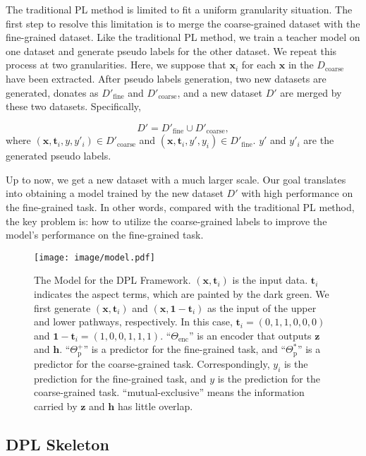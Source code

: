 \documentclass[11pt]{article}
\newcommand{\bx}{\mathbf{x}}
\newcommand{\bt}{\mathbf{t}}
\newcommand{\bz}{\mathbf{z}}
\newcommand{\bh}{\mathbf{h}}
\begin{document}
The traditional PL method is limited to fit a uniform granularity situation.
The first step to resolve this limitation is to merge the coarse-grained dataset with the fine-grained dataset.
Like the traditional PL method, we train a teacher model on one dataset and generate pseudo labels for the other dataset. We repeat this process at two granularities.
Here, we suppose that $\bx_i$ for each $\bx$ in the $D_{\text{coarse}}$ have been extracted.
After pseudo labels generation, two new datasets are generated, donates as $D'_{\text{fine}}$ and $D'_{\text{coarse}}$, and a new dataset $D'$ are merged by these two datasets.
Specifically, 

\begin{equation}
    D' = D'_{\text{fine}} \cup D'_{\text{coarse}},
\end{equation}
where $(\bx, \bt_i, y, y'_i) \in D'_{\text{coarse}}$ and $(\bx, \bt_i, y', y_i) \in D'_{\text{fine}}$.
$y'$ and $y'_i$ are the generated pseudo labels.


Up to now, we get a new dataset with a much larger scale. Our goal translates into obtaining a model trained by the new dataset $D'$ with high performance on the fine-grained task.
In other words, compared with the traditional PL method, 
the key problem is: how to utilize the coarse-grained labels to improve the model's performance on the fine-grained task.

\begin{figure*}
  \centering
  \texttt{[image: image/model.pdf]} 
  \caption{The Model for the DPL Framework. $(\bx, \bt_i)$ is the input data. $\bt_i$ indicates the aspect terms, which are painted by the dark green. We first generate $(\bx, \bt_i)$ and $(\bx, \mathbf{1}-\bt_i)$ as the input of the upper and lower pathways, respectively. In this case, $\bt_i = (0,1,1,0,0,0)$ and $\mathbf{1}-\bt_i = (1,0,0,1,1,1)$. ``$\Theta_{\text{enc}}$'' is an encoder that outputs $\bz$ and $\bh$. ``$\Theta^+_{\text{p}}$'' is a predictor for the fine-grained task, and ``$\Theta^*_{\text{p}}$'' is a predictor for the coarse-grained task. Correspondingly, $y_i$ is the prediction for the fine-grained task, and $y$ is the prediction for the coarse-grained task. ``mutual-exclusive'' means the information carried by $\bz$ and $\bh$ has little overlap.}
  \label{fig:model}
\end{figure*}

\subsection{DPL Skeleton}
\end{document}
